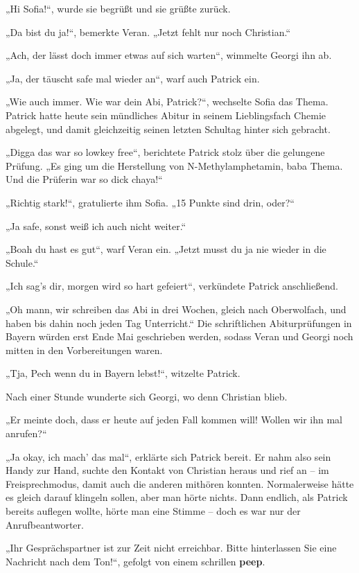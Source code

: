 \documentclass[oneside]{memoir}
\begin{document}
„Hi Sofia!“, wurde sie begrüßt und sie grüßte zurück.

„Da bist du ja!“, bemerkte Veran. „Jetzt fehlt nur noch Christian.“

„Ach, der lässt doch immer etwas auf sich warten“, wimmelte Georgi ihn ab.

„Ja, der täuscht safe mal wieder an“, warf auch Patrick ein.

„Wie auch immer. Wie war dein Abi, Patrick?“, wechselte Sofia das Thema. Patrick hatte heute sein mündliches Abitur in seinem Lieblingsfach Chemie abgelegt, und damit gleichzeitig seinen letzten Schultag hinter sich gebracht.

„Digga das war so lowkey free“, berichtete Patrick stolz über die gelungene Prüfung. „Es ging um die Herstellung von N-Methylamphetamin, baba Thema. Und die Prüferin war so dick chaya!“

„Richtig stark!“, gratulierte ihm Sofia. „15 Punkte sind drin, oder?“

„Ja safe, sonst weiß ich auch nicht weiter.“

„Boah du hast es gut“, warf Veran ein. „Jetzt musst du ja nie wieder in die Schule.“

„Ich sag's dir, morgen wird so hart gefeiert“, verkündete Patrick anschließend.

„Oh mann, wir schreiben das Abi in drei Wochen, gleich nach Oberwolfach, und haben bis dahin noch jeden Tag Unterricht.“ Die schriftlichen Abiturprüfungen in Bayern würden erst Ende Mai geschrieben werden, sodass Veran und Georgi noch mitten in den Vorbereitungen waren.

„Tja, Pech wenn du in Bayern lebst!“, witzelte Patrick.

\bigskip
Nach einer Stunde wunderte sich Georgi, wo denn Christian blieb.

„Er meinte doch, dass er heute auf jeden Fall kommen will! Wollen wir ihn mal anrufen?“

„Ja okay, ich mach' das mal“, erklärte sich Patrick bereit. Er nahm also sein Handy zur Hand, suchte den Kontakt von Christian heraus und rief an -- im Freisprechmodus, damit auch die anderen mithören konnten.
Normalerweise hätte es gleich darauf klingeln sollen, aber man hörte nichts. Dann endlich, als Patrick bereits auflegen wollte, hörte man eine Stimme -- doch es war nur der Anrufbeantworter.

„Ihr Gesprächspartner ist zur Zeit nicht erreichbar. Bitte hinterlassen Sie eine Nachricht nach dem Ton!“, gefolgt von einem schrillen \textbf{peep}.
\end{document}
